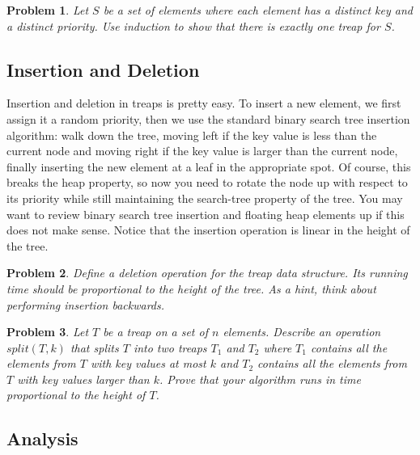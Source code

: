 \documentclass[11pt]{article}
\newtheorem{problem}{Problem}
\begin{document}
\begin{problem}
Let $S$ be a set of elements where each element has a distinct key and a distinct priority.  Use induction to show that there is exactly one treap for $S$.
\end{problem}

\subsection{Insertion and Deletion}

Insertion and deletion in treaps is pretty easy.  To insert a new element, we first assign it a random priority, then we use the standard binary search tree insertion algorithm:  walk down the tree, moving left if the key value is less than the current node and moving right if the key value is larger than the current node, finally inserting the new element at a leaf in the appropriate spot.  Of course, this breaks the heap property, so now you need to rotate the node up with respect to its priority while still maintaining the search-tree property of the tree.  You may want to review binary search tree insertion and floating heap elements up if this does not make sense.  Notice that the insertion operation is linear in the height of the tree.  

\begin{problem}
Define a deletion operation for the treap data structure.  Its running time should be proportional to the height of the tree.  As a hint, think about performing insertion backwards.
\end{problem}

\begin{problem} \label{prob:split}
Let $T$ be a treap on a set of $n$ elements.  Describe an operation $split(T,k)$ that splits $T$ into two treaps $T_{1}$ and $T_{2}$ where $T_{1}$ contains all the elements from $T$ with key values at most $k$ and $T_{2}$ contains all the elements from $T$ with key values larger than $k$.  Prove that your algorithm runs in time proportional to the height of $T$.
\end{problem}

\subsection{Analysis}
\end{document}
